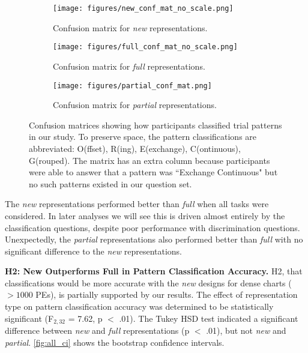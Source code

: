     
\begin{figure*}
    \centering
    \begin{subfigure}{0.28\textwidth}
        \centering
        \texttt{[image: figures/new\_conf\_mat\_no\_scale.png]}
        \caption{Confusion matrix for {\em new} representations.}
        \label{fig:abstract_conf_mat}
    \end{subfigure}
    \begin{subfigure}{0.28\textwidth}
        \centering
        \texttt{[image: figures/full\_conf\_mat\_no\_scale.png]}
        \caption{Confusion matrix for {\em full} representations. }
        \label{fig:full_conf_mat}
    \end{subfigure}
    \begin{subfigure}{0.37\textwidth}
        \centering
        \texttt{[image: figures/partial\_conf\_mat.png]}
        \caption{Confusion matrix for {\em partial} representations.}
        \label{fig:partial_conf_mat}
    \end{subfigure}
    
    \caption{Confusion matrices showing how participants classified trial patterns in our study. To preserve space, the pattern classifications are abbreviated: O(ffset), R(ing), E(exchange), C(ontinuous), G(rouped). The matrix has an extra column because participants were able to answer that a pattern was ``Exchange Continuous" but no such patterns existed in our question set. }
    \label{fig:confusion_matrices}
\end{figure*}

The {\em new} representations performed better than {\em full} when all tasks were considered. In later analyses we will see this is driven almost entirely by the classification questions, despite poor performance with discrimination questions. Unexpectedly, the {\em partial} representations also performed better than {\em full} with no significant difference to the {\em new} representations. 


\vspace{1ex}

\textbf{H2: New Outperforms Full in Pattern Classification Accuracy.} H2, that classifications would be more accurate with the {\em new} designs for dense charts ($>1000$ PEs), is partially supported by our results. The effect of representation type on pattern classification accuracy was determined to be statistically significant (F$_{2,32}$ = 7.62, p $<$ .01). The Tukey HSD test indicated a significant difference between {\em new} and {\em full} representations (p $<$ .01), but not {\em new} and {\em partial}. \autoref{fig:all_ci} shows the bootstrap confidence intervals.



